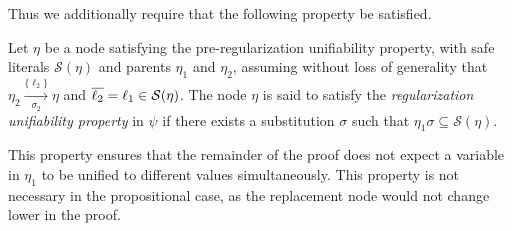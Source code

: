\noindent
Thus we additionally require that the following property be satisfied.
\begin{definition}
\label{prop:extracheck}
Let $\eta$ be a node satisfying the pre-regularization unifiability property, with safe literals $\mathcal{S}(\eta)$ and parents $\eta_1$ and $\eta_2$, assuming without loss of generality that
$\eta_2 \xrightarrow[\sigma_2]{\{\ell_2\} } \eta$ and $\overline{\ell_2} = \ell_1 \in \mathcal{S}(\eta)$. 
The node $\eta$ is said to satisfy the \emph{regularization unifiability property} in $\psi$ if there exists a substitution $\sigma$ such that $\eta_1\sigma \subseteq \mathcal{S}(\eta)$.
\end{definition}
This property ensures that the remainder of the proof does not expect a variable in $\eta_1$ to be unified to different values simultaneously. This property is not necessary in the propositional case, as the replacement node would not change lower in the proof. 





